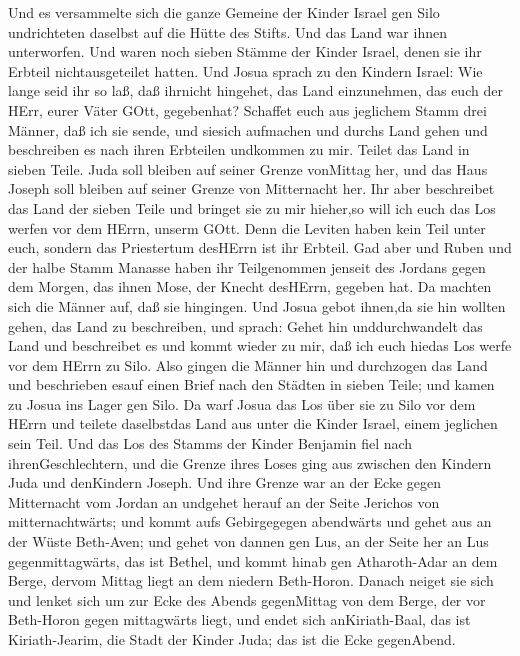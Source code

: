  Und es versammelte sich die ganze Gemeine der Kinder Israel
gen Silo undrichteten daselbst auf die Hütte des Stifts. Und das Land
war ihnen unterworfen.  Und waren noch sieben Stämme der
Kinder Israel, denen sie ihr Erbteil nichtausgeteilet hatten.
 Und Josua sprach zu den Kindern Israel: Wie lange seid ihr
so laß, daß ihrnicht hingehet, das Land einzunehmen, das euch der HErr,
eurer Väter GOtt, gegebenhat?  Schaffet euch aus jeglichem
Stamm drei Männer, daß ich sie sende, und siesich aufmachen und durchs
Land gehen und beschreiben es nach ihren Erbteilen undkommen zu mir.
 Teilet das Land in sieben Teile. Juda soll bleiben auf
seiner Grenze vonMittag her, und das Haus Joseph soll bleiben auf seiner
Grenze von Mitternacht her.  Ihr aber beschreibet das Land
der sieben Teile und bringet sie zu mir hieher,so will ich euch das Los
werfen vor dem HErrn, unserm GOtt.  Denn die Leviten haben
kein Teil unter euch, sondern das Priestertum desHErrn ist ihr Erbteil.
Gad aber und Ruben und der halbe Stamm Manasse haben ihr Teilgenommen
jenseit des Jordans gegen dem Morgen, das ihnen Mose, der Knecht
desHErrn, gegeben hat.  Da machten sich die Männer auf, daß
sie hingingen. Und Josua gebot ihnen,da sie hin wollten gehen, das Land
zu beschreiben, und sprach: Gehet hin unddurchwandelt das Land und
beschreibet es und kommt wieder zu mir, daß ich euch hiedas Los werfe
vor dem HErrn zu Silo.  Also gingen die Männer hin und
durchzogen das Land und beschrieben esauf einen Brief nach den Städten
in sieben Teile; und kamen zu Josua ins Lager gen Silo.  Da
warf Josua das Los über sie zu Silo vor dem HErrn und teilete
daselbstdas Land aus unter die Kinder Israel, einem jeglichen sein Teil.
 Und das Los des Stamms der Kinder Benjamin fiel nach
ihrenGeschlechtern, und die Grenze ihres Loses ging aus zwischen den
Kindern Juda und denKindern Joseph.  Und ihre Grenze war an
der Ecke gegen Mitternacht vom Jordan an undgehet herauf an der Seite
Jerichos von mitternachtwärts; und kommt aufs Gebirgegegen abendwärts
und gehet aus an der Wüste Beth-Aven;  und gehet von dannen
gen Lus, an der Seite her an Lus gegenmittagwärts, das ist Bethel, und
kommt hinab gen Atharoth-Adar an dem Berge, dervom Mittag liegt an dem
niedern Beth-Horon.  Danach neiget sie sich und lenket sich
um zur Ecke des Abends gegenMittag von dem Berge, der vor Beth-Horon
gegen mittagwärts liegt, und endet sich anKiriath-Baal, das ist
Kiriath-Jearim, die Stadt der Kinder Juda; das ist die Ecke gegenAbend.
